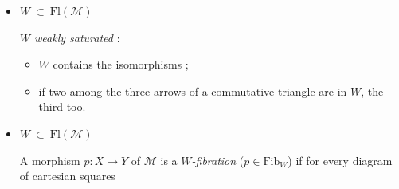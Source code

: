 \documentclass[11pt]{article}
\newcommand{\Fl}{\mathrm{Fl}}
\begin{document}
\begin{itemize}
\item $W \ \subset\ \Fl(\mathcal{M})$

\textit{$W$ weakly saturated} :
\begin{itemize}
\item[a)] $W$ contains the isomorphisms ;
\item[b)] if two among the three arrows of a commutative triangle are in $W$, the third too.
\end{itemize}

\item $W \ \subset\ \Fl(\mathcal{M})$

A morphism $p : X \longrightarrow Y$ of $\mathcal{M}$ is a \textit{$W$-fibration} ($p \in \mathrm{Fib}_W$) if for every diagram of cartesian squares
\end{itemize}
\end{document}
